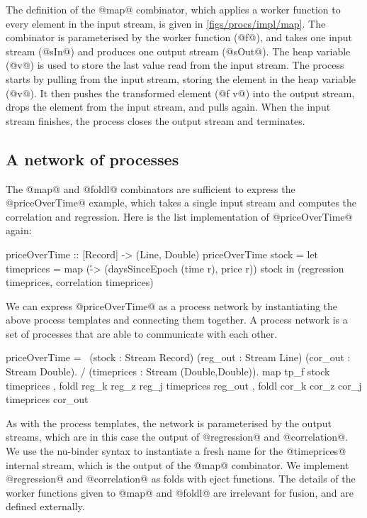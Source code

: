 The definition of the @map@ combinator, which applies a worker function to every element in the input stream, is given in \cref{figs/procs/impl/map}.
The combinator is parameterised by the worker function (@f@), and takes one input stream (@sIn@) and produces one output stream (@sOut@).
The heap variable (@v@) is used to store the last value read from the input stream.
The process starts by pulling from the input stream, storing the element in the heap variable (@v@).
It then pushes the transformed element (@f v@) into the output stream, drops the element from the input stream, and pulls again.
When the input stream finishes, the process closes the output stream and terminates.

\subsection{A network of processes}
The @map@ and @foldl@ combinators are sufficient to express the @priceOverTime@ example, which takes a single input stream and computes the correlation and regression.
Here is the list implementation of @priceOverTime@ again:

\begin{haskell}
priceOverTime :: [Record] -> (Line, Double)
priceOverTime stock =
  let timeprices = map (\r -> (daysSinceEpoch (time r), price r)) stock
  in (regression timeprices, correlation timeprices)
\end{haskell}

We can express @priceOverTime@ as a process network by instantiating the above process templates and connecting them together.
A process network is a set of processes that are able to communicate with each other.

\begin{process}
priceOverTime =
  \ (stock : Stream Record)
    (reg_out : Stream Line) (cor_out : Stream Double).
  / (timeprices : Stream (Double,Double)).
     { map    tp_f             stock      timeprices
     , foldl reg_k reg_z reg_j timeprices reg_out
     , foldl cor_k cor_z cor_j timeprices cor_out }
\end{process}

As with the process templates, the network is parameterised by the output streams, which are in this case the output of @regression@ and @correlation@.
We use the nu-binder syntax to instantiate a fresh name for the @timeprices@ internal stream, which is the output of the @map@ combinator.
We implement @regression@ and @correlation@ as folds with eject functions.
The details of the worker functions given to @map@ and @foldl@ are irrelevant for fusion, and are defined externally.

